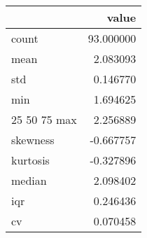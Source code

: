 \begin{tabular}{lr}
\toprule
 & value \\
\midrule
count & 93.000000 \\
mean & 2.083093 \\
std & 0.146770 \\
min & 1.694625 \\
25%
50%
75%
max & 2.256889 \\
skewness & -0.667757 \\
kurtosis & -0.327896 \\
median & 2.098402 \\
iqr & 0.246436 \\
cv & 0.070458 \\
\bottomrule
\end{tabular}
